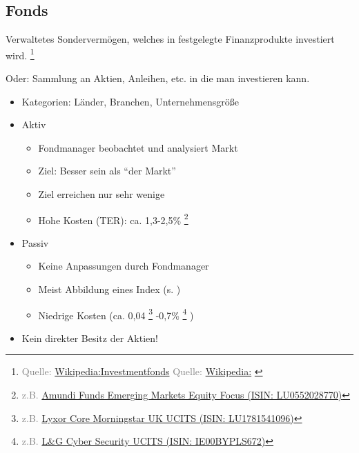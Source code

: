 \documentclass{beamer}
\let\oldfootnote\footnote
\renewcommand{\footnote}[1]
{%
	\oldfootnote
	{
		\tiny
		\textcolor{gray}{#1}
	}%
}
\newcommand{\citewiki}[2][]
{%
	\footnote
	{
		\ifthenelse{\isempty{#1}}
		{
			Quelle: \href{https://de.wikipedia.org/wiki/#2}{Wikipedia:#2}
		}
		{
			Quelle: \href{https://de.wikipedia.org/wiki/#2}{Wikipedia:#1}
		}
	}
}
\begin{document}
		\subsection{Fonds}
		
			\begin{frame}
				\begin{definition}
					Verwaltetes Sondervermögen, welches in festgelegte Finanzprodukte investiert wird.\citewiki{Investmentfonds}
				\end{definition}
				Oder: Sammlung an Aktien, Anleihen, etc. in die man investieren kann.
			\end{frame}
		
			\begin{frame}
				\begin{itemize}
					\item Kategorien: Länder, Branchen, Unternehmensgröße\pause
					\item Aktiv
					\begin{itemize}
						\item Fondmanager beobachtet und analysiert Markt
						\item Ziel: Besser sein als "`der Markt"'
						\item Ziel erreichen nur sehr wenige
						\item Hohe Kosten (TER): ca. 1,3-2,5\%\footnote{z.B. \href{https://www.comdirect.de/inf/fonds/LU0552028770}{Amundi Funds Emerging Markets Equity Focus (ISIN: LU0552028770)}}
					\end{itemize}\pause
					\item Passiv\pause
					\begin{itemize}
						\item Keine Anpassungen durch Fondmanager
						\item Meist Abbildung eines Index (s. \nameref{subsec:etfs})
						\item Niedrige Kosten (ca. 0,04\footnote{z.B. \href{https://de.extraetf.com/etf-profile/LU1781541096}{Lyxor Core Morningstar UK UCITS (ISIN: LU1781541096)}}-0,7\%\footnote{z.B. \href{https://de.extraetf.com/etf-profile/IE00BYPLS672}{L\&G Cyber Security UCITS (ISIN: IE00BYPLS672)}})
					\end{itemize}\pause
					\item Kein direkter Besitz der Aktien!
				\end{itemize}
			\end{frame}
		
\end{document}
